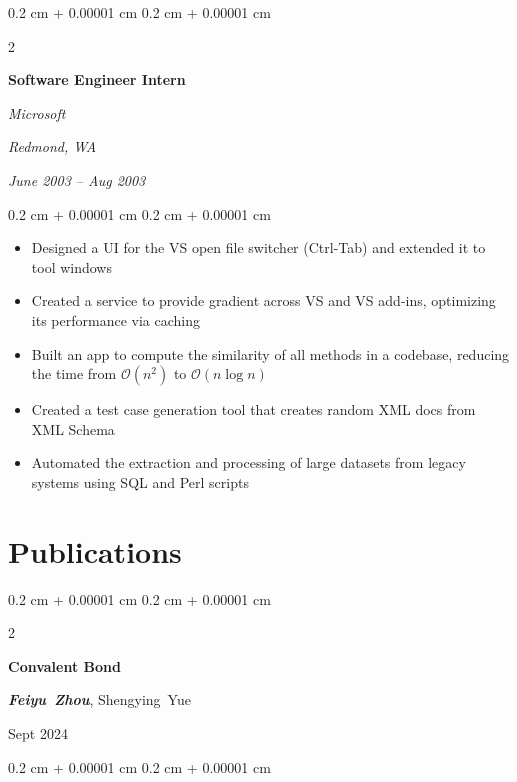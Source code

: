\documentclass[10pt, letterpaper]{article}
\newenvironment{highlights}{
    \begin{itemize}[
        topsep=0.10 cm,
        parsep=0.10 cm,
        partopsep=0pt,
        itemsep=0pt,
        leftmargin=0.4 cm + 10pt
    ]
}{
    \end{itemize}
} %
\newenvironment{onecolentry}{
    \begin{adjustwidth}{
        0.2 cm + 0.00001 cm
    }{
        0.2 cm + 0.00001 cm
    }
}{
    \end{adjustwidth}
} %
\newenvironment{twocolentry}[2][]{
    \onecolentry
    \def\secondColumn{#2}
    \setcolumnwidth{\fill, 5.5 cm}
    \begin{paracol}{2}
}{
    \switchcolumn \raggedleft \secondColumn
    \end{paracol}
    \endonecolentry
} %
\let\hrefWithoutArrow\href
\renewcommand{\href}[2]{\hrefWithoutArrow{#1}{\ifthenelse{\equal{#2}{}}{ }{#2 }\raisebox{.15ex}{\footnotesize \faExternalLink*}}}
\begin{document}
        \vspace{0.2 cm}

        \begin{twocolentry}{
        \textit{Redmond, WA}    
            
        \textit{June 2003 – Aug 2003}}
            \textbf{Software Engineer Intern}
            
            \textit{Microsoft}
        \end{twocolentry}

        \vspace{0.10 cm}
        \begin{onecolentry}
            \begin{highlights}
                \item Designed a UI for the VS open file switcher (Ctrl-Tab) and extended it to tool windows
                \item Created a service to provide gradient across VS and VS add-ins, optimizing its performance via caching
                \item Built an app to compute the similarity of all methods in a codebase, reducing the time from $\mathcal{O}(n^2)$ to $\mathcal{O}(n \log n)$
                \item Created a test case generation tool that creates random XML docs from XML Schema
                \item Automated the extraction and processing of large datasets from legacy systems using SQL and Perl scripts
            \end{highlights}
        \end{onecolentry}



    
    \section{Publications}

        \begin{samepage}
            \begin{twocolentry}{
                Sept 2024
            }
                \textbf{Convalent Bond}

                \vspace{0.10 cm}

                \mbox{\textbf{\textit{Feiyu Zhou}}}, \mbox{Shengying Yue}
            \end{twocolentry}


            \vspace{0.10 cm}

            \begin{onecolentry}
                \href{Later}{Later}
            \end{onecolentry}
        \end{samepage}
\end{document}
